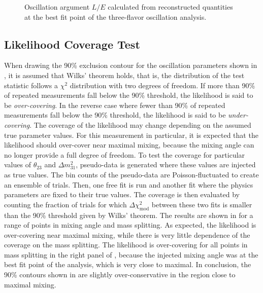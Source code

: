 %     
%     

\begin{figure}
    \centering
    
    \caption{Oscillation argument $L/E$ calculated from reconstructed quantities at the best fit point of the three-flavor oscillation analysis.}
    \label{fig:data_mc_post_fit_l_over_e}
\end{figure}

\subsection{Likelihood Coverage Test}

When drawing the 90\% exclusion contour for the oscillation parameters shown in , it is assumed that Wilks' theorem holds, that is, the distribution of the test statistic follows a $\chi^2$ distribution with two degrees of freedom. If more than 90\% of repeated measurements fall below the 90\% threshold, the likelihood is said to be \emph{over-covering}. In the reverse case where fewer than 90\% of repeated measurements fall below the 90\% threshold, the likelihood is said to be \emph{under-covering}. The coverage of the likelihood may change depending on the assumed true parameter values. For this measurement in particular, it is expected that the likelihood should over-cover near maximal mixing, because the mixing angle can no longer provide a full degree of freedom. To test the coverage for particular values of $\theta_{23}$ and $\Delta m^2_{31}$, pseudo-data is generated where these values are injected as true values. The bin counts of the pseudo-data are Poisson-fluctuated to create an ensemble of trials. Then, one free fit is run and another fit where the physics parameters are fixed to their true values. The coverage is then evaluated by counting the fraction of trials for which $\Delta \chi^2_{\mathrm{mod}}$ between these two fits is smaller than the 90\% threshold given by Wilks' theorem. The results are shown in  for a range of points in mixing angle and mass splitting. As expected, the likelihood is over-covering near maximal mixing, while there is very little dependence of the coverage on the mass splitting. The likelihood is over-covering for all points in mass splitting in the right panel of , because the injected mixing angle was at the best fit point of the analysis, which is very close to maximal. In conclusion, the 90\% contours shown in  are slightly over-conservative in the region close to maximal mixing.

